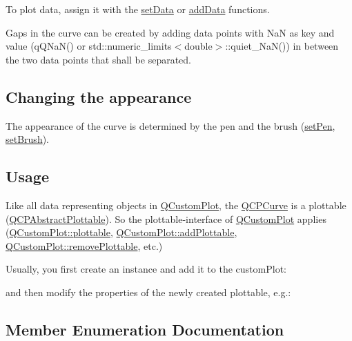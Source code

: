 To plot data, assign it with the \hyperlink{class_q_c_p_curve_a631ac886708460013b30052f49cbc9da}{set\+Data} or \hyperlink{class_q_c_p_curve_a4e24023c3b9ac75440c7a260172c99af}{add\+Data} functions.

Gaps in the curve can be created by adding data points with NaN as key and value ({\ttfamily q\+Q\+Na\+N()} or {\ttfamily std\+::numeric\+\_\+limits$<$double$>$\+::quiet\+\_\+\+Na\+N()}) in between the two data points that shall be separated.\hypertarget{class_q_c_p_statistical_box_appearance}{}\subsection{Changing the appearance}\label{class_q_c_p_statistical_box_appearance}
The appearance of the curve is determined by the pen and the brush (\hyperlink{class_q_c_p_abstract_plottable_ab74b09ae4c0e7e13142fe4b5bf46cac7}{set\+Pen}, \hyperlink{class_q_c_p_abstract_plottable_a7a4b92144dca6453a1f0f210e27edc74}{set\+Brush}). \hypertarget{class_q_c_p_statistical_box_usage}{}\subsection{Usage}\label{class_q_c_p_statistical_box_usage}
Like all data representing objects in \hyperlink{class_q_custom_plot}{Q\+Custom\+Plot}, the \hyperlink{class_q_c_p_curve}{Q\+C\+P\+Curve} is a plottable (\hyperlink{class_q_c_p_abstract_plottable}{Q\+C\+P\+Abstract\+Plottable}). So the plottable-\/interface of \hyperlink{class_q_custom_plot}{Q\+Custom\+Plot} applies (\hyperlink{class_q_custom_plot_a32de81ff53e263e785b83b52ecd99d6f}{Q\+Custom\+Plot\+::plottable}, \hyperlink{class_q_custom_plot_ab7ad9174f701f9c6f64e378df77927a6}{Q\+Custom\+Plot\+::add\+Plottable}, \hyperlink{class_q_custom_plot_af3dafd56884208474f311d6226513ab2}{Q\+Custom\+Plot\+::remove\+Plottable}, etc.)

Usually, you first create an instance and add it to the custom\+Plot\+: 
\begin{DoxyCodeInclude}
\end{DoxyCodeInclude}
and then modify the properties of the newly created plottable, e.\+g.\+: 
\begin{DoxyCodeInclude}
\end{DoxyCodeInclude}


\subsection{Member Enumeration Documentation}
\hypertarget{class_q_c_p_curve_a2710e9f79302152cff794c6e16cc01f1}{}\label{class_q_c_p_curve_a2710e9f79302152cff794c6e16cc01f1} 
